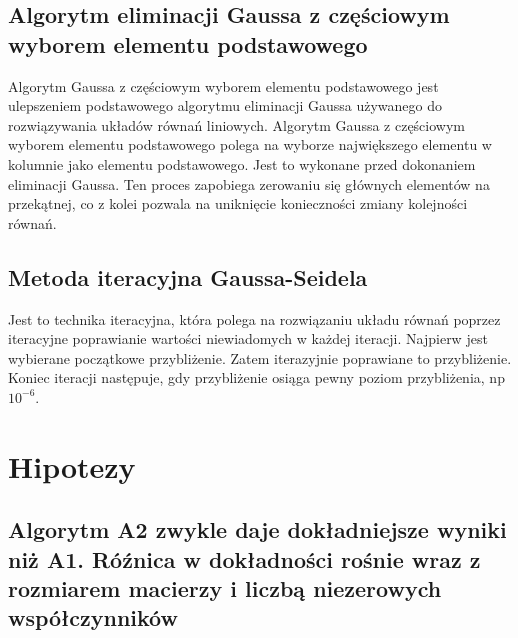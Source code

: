 \documentclass[12pt,a4paper]{article}
\begin{document}
\subsection{Algorytm eliminacji Gaussa z częściowym wyborem  elementu podstawowego}

Algorytm Gaussa z częściowym wyborem elementu podstawowego jest ulepszeniem podstawowego algorytmu eliminacji Gaussa używanego do rozwiązywania układów równań liniowych.  Algorytm Gaussa z częściowym wyborem elementu podstawowego polega na wyborze największego elementu w kolumnie jako elementu podstawowego. Jest to wykonane przed dokonaniem eliminacji Gaussa. Ten proces zapobiega zerowaniu się głównych elementów na przekątnej, co z kolei pozwala na uniknięcie konieczności zmiany kolejności równań.

\subsection{Metoda iteracyjna Gaussa-Seidela}

Jest to technika iteracyjna, która polega na rozwiązaniu układu równań poprzez iteracyjne poprawianie wartości niewiadomych w każdej iteracji. Najpierw jest wybierane początkowe przybliżenie. Zatem iterazyjnie poprawiane to przybliżenie. Koniec iteracji następuje, gdy przybliżenie osiąga pewny poziom przybliżenia, np $10^{-6}$.



\newpage
\section{Hipotezy}
\subsection{Algorytm A2 zwykle daje dokładniejsze wyniki niż A1. Róźnica w dokładności rośnie wraz z rozmiarem macierzy i liczbą niezerowych współczynników}
\end{document}
